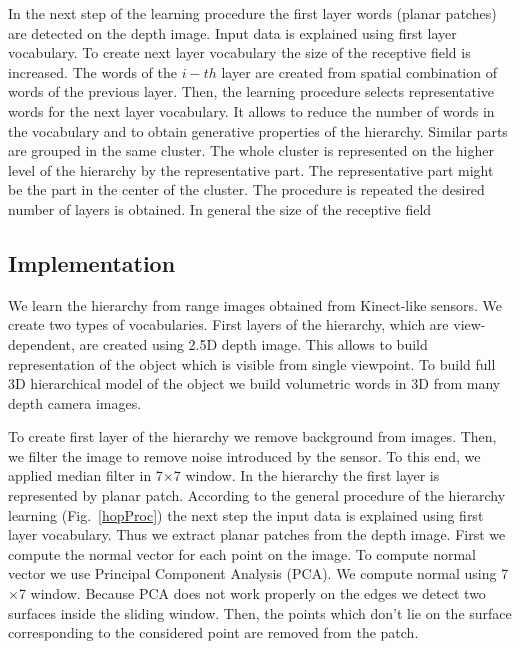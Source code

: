 \documentclass[letterpaper,10pt,conference]{ieeeconf}  %
\begin{document}
In the next step of the learning procedure the first layer words (planar patches) are detected on the depth image. Input data is explained using first layer vocabulary. To create next layer vocabulary the size of the receptive field is increased. The words of the $i-th$ layer are created from spatial combination of words of the previous layer. Then, the learning procedure selects representative words for the next layer vocabulary. It allows to reduce the number of words in the vocabulary and to obtain generative properties of the hierarchy. Similar parts are grouped in the same cluster. The whole cluster is represented on the higher level of the hierarchy by the representative part. The representative part might be the part in the center of the cluster. The procedure is repeated the desired number of layers is obtained. In general the size of the receptive field 

\subsection{Implementation}

We learn the hierarchy from range images obtained from Kinect-like sensors. We create two types of vocabularies. First layers of the hierarchy, which are view-dependent, are created using 2.5D depth image. This allows to build representation of the object which is visible from single viewpoint. To build full 3D hierarchical model of the object we build volumetric words in 3D from many depth camera images. 

To create first layer of the hierarchy we remove background from images. Then, we filter the image to remove noise introduced by the sensor. To this end, we applied median filter in 7$\times$7 window. In the hierarchy the first layer is represented by planar patch. According to the general procedure of the hierarchy learning (Fig.~\ref{hopProc}) the next step the input data is explained using first layer vocabulary. Thus we extract planar patches from the depth image. First we compute the normal vector for each point on the image. To compute normal vector we use Principal Component Analysis (PCA). We compute normal using 7$\times$7 window. Because PCA does not work properly on the edges we detect two surfaces inside the sliding window. Then, the points which don't lie on the surface corresponding to the considered point are removed from the patch.
\end{document}
